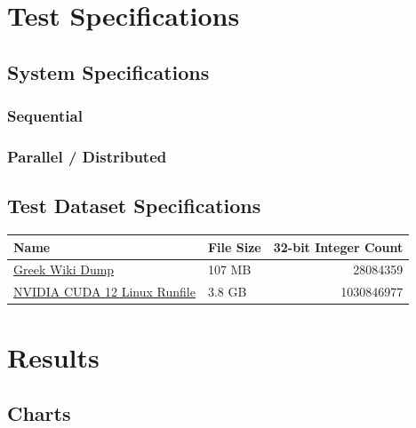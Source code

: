 \documentclass[11pt]{article}
\begin{document}
\section{Test Specifications}
\label{sec:orge906da4}
\subsection{System Specifications}
\label{sec:orgcc98fa9}
\subsubsection{Sequential}
\label{sec:orgbb0a366}
\subsubsection{Parallel / Distributed}
\label{sec:org543559e}
\subsection{Test Dataset Specifications}
\label{sec:org1d72e11}
\begin{center}
\begin{tabular}{llr}
\hline
Name & File Size & 32-bit Integer Count\\[0pt]
\hline
\href{https://dumps.wikimedia.org/other/static\_html\_dumps/current/el/wikipedia-el-html.tar.7z}{Greek Wiki Dump} & 107 MB & 28084359\\[0pt]
\href{https://developer.download.nvidia.com/compute/cuda/12.0.0/local\_installers/cuda\_12.0.0\_525.60.13\_linux.run}{NVIDIA CUDA 12 Linux Runfile} & 3.8 GB & 1030846977\\[0pt]
\hline
\end{tabular}
\end{center}
\section{Results}
\label{sec:orgb49e4a2}
\subsection{Charts}
\label{sec:orgdbf1a55}
\end{document}
